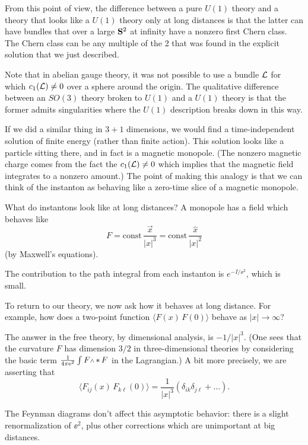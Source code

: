 {}From this point of view, the difference between a pure $U(1)$ theory
and a theory that looks like a $U(1)$ theory only at long distances
is that the latter can have bundles that over a large ${\bf S}^2$
at infinity have a nonzero first Chern class.  The Chern class can
be any multiple of the 2 that was found in the explicit solution that
we just described.


Note that in abelian gauge theory, it was not possible to use a bundle ${\cal L}$
for which $c_1({\cal L})\ne0$ over a sphere around the origin.  The qualitative
difference between an $SO(3)$ theory broken to $U(1)$ and a $U(1)$ theory
is that the former admits singularities where the $U(1)$ description
breaks down in this way.

If we did a similar thing in $3+1$ dimensions, we would find a time-independent
solution of finite energy (rather than finite action).  This solution looks
like a particle sitting there, and in fact is a magnetic monopole.  (The
nonzero magnetic charge comes from the fact the $c_1({\cal L})\ne0$ which implies
that the magnetic field integrates to a nonzero amount.)  The point of making
this analogy is that we can think of the instanton as behaving like a zero-time
slice of a magnetic monopole.


What do instantons look like at long distances?  A monopole has a field which
behaves like
\begin{equation}
F=\text{const}\,\frac{\vec{x}}{|x|^3}=\text{const}\,\frac{\hat{x}}{|x|^2}
\end{equation}
(by Maxwell's equations).

The contribution to the path integral from each instanton is $e^{-I/\ee^2}$,
which is small.

To return to our theory, we now ask how it behaves at long distance.  For
example, how does a two-point function $\langle F(x)\,F(0)\rangle$ behave as
$|x|\to\infty$?

The answer in the free theory, by dimensional analysis, is $-1/|x|^3$.  (One
sees that the curvature $F$ has dimension $3/2$ in three-dimensional theories
by considering the basic term $\frac1{4\pi\ee^2}\int F\wdg\hstar F$ in the
Lagrangian.)  A bit more precisely, we are asserting that
\begin{equation}
\langle
F_{ij}(x)\,F_{k\ell}(0)\rangle=\frac1{|x|^3}(\delta_{ik}\delta_{j\ell}+\dots).
\end{equation}

The Feynman diagrams don't affect this asymptotic behavior: there is a slight
renormalization of $\ee^2$, plus other corrections which are unimportant at big
 distances.

